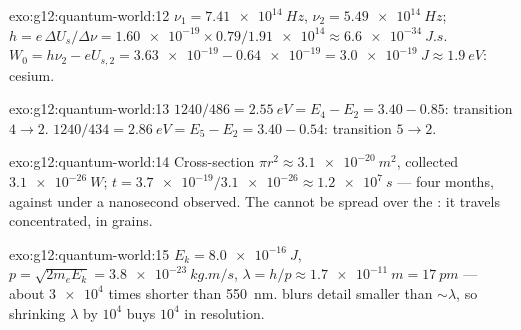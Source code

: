 \begin{solution}{exo:g12:quantum-world:12}
$\nu_1 = \qty{7.41e14}{Hz}$, $\nu_2 = \qty{5.49e14}{Hz}$;
$h = e\,\Delta U_s/\Delta\nu = \num{1.60e-19} \times 0.79 /
\num{1.91e14} \approx \qty{6.6e-34}{J.s}$. $W_0 = h\nu_2 - eU_{s,2} =
\num{3.63e-19} - \num{0.64e-19} = \qty{3.0e-19}{J} \approx
\qty{1.9}{eV}$: cesium.
\end{solution}

\begin{solution}{exo:g12:quantum-world:13}
$1240/486 = \qty{2.55}{eV} = E_4 - E_2 = 3.40 - 0.85$: transition
$4 \to 2$. $1240/434 = \qty{2.86}{eV} = E_5 - E_2 = 3.40 - 0.54$:
transition $5 \to 2$.
\end{solution}

\begin{solution}{exo:g12:quantum-world:14}
Cross-section $\pi r^2 \approx \qty{3.1e-20}{m^2}$, collected 
$\qty{3.1e-26}{W}$; $t = \num{3.7e-19}/\num{3.1e-26} \approx
\qty{1.2e7}{s}$ --- four months, against under a nanosecond observed.
The  cannot be spread over the : it travels
concentrated, in grains.
\end{solution}

\begin{solution}{exo:g12:quantum-world:15}
$E_k = \qty{8.0e-16}{J}$, $p = \sqrt{2m_e E_k} =
\qty{3.8e-23}{kg.m/s}$, $\lambda = h/p \approx \qty{1.7e-11}{m} =
\qty{17}{pm}$ --- about $\num{3e4}$ times shorter than \qty{550}{nm}.
 blurs detail smaller than $\sim\lambda$, so shrinking
$\lambda$ by $10^4$ buys $10^4$ in resolution.
\end{solution}

